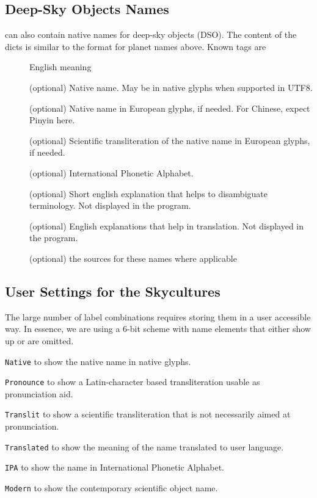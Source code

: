 \subsection{Deep-Sky Objects Names}
\label{sec:skycultures:dsonames}

 can also contain native names for
deep-sky objects (DSO). The content  of the dicts is similar to the 
format for planet names above. %
Known tags are 
\begin{description}
\item[] English meaning
\item[] (optional) Native name. May be in native glyphs when supported in UTF8.
\item[] (optional) Native name in European glyphs, if needed. For Chinese, expect Pinyin here.
\item[] (optional) Scientific transliteration of the native name in European glyphs, if needed.
\item[] (optional) International Phonetic Alphabet.
\item[] (optional) Short english explanation that helps to disambiguate terminology. Not displayed in the program.
\item[] (optional) English explanations that help in translation. Not displayed in the program.
\item[]  (optional) the sources for these names where applicable
\end{description}

\subsection{User Settings for the Skycultures}
\label{SC:settings}

The large number of label combinations requires storing them in a user accessible way. In essence, we are using a 6-bit scheme with name elements that either show up or are omitted.
\begin{description}
\item{\texttt{Native}} to show the native name in native glyphs.
\item{\texttt{Pronounce}} to show a Latin-character based transliteration usable as pronunciation aid.
\item{\texttt{Translit}} to show a scientific transliteration that is not necessarily aimed at pronunciation.
\item{\texttt{Translated}} to show the meaning of the name translated to user language. 
\item{\texttt{IPA}} to show the name in International Phonetic Alphabet.
\item{\texttt{Modern}} to show the contemporary scientific object name.
\end{description}

